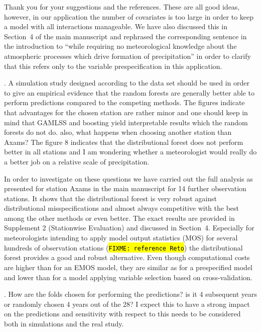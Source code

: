 \documentclass[american,foldmarks=false,noconfig]{uibklttr}
\newenvironment{review}{\fontshape{\itdefault}\fontseries{\bfdefault} \selectfont \smallskip}{\par}
\begin{document}
Thank you for your suggestions and the references. These are all
good ideas, however, in our application the number of covariates
is too large in order to keep a model with all interactions manageable.
We have also discussed this in Section~4 of the main manuscript and
rephrased the corresponding sentence in the introduction to ``while 
requiring no meteorological knowledge about the atmospheric processes 
which drive formation of precipitation'' in order to clarify that
this refers only to the variable prespecification in this application.


\begin{review}
6. A simulation study designed according to the data set should 
be used in order to give an empirical evidence that the random 
forests are generally better able to perform predictions compared 
to the competing methods. The figures indicate that advantages 
for the chosen station are rather minor and one should keep in 
mind that GAMLSS and boosting yield interpretable results which 
the random forests do not do. also, what happens when choosing 
another station than Axams? The figure 8 indicates that the 
distributional forest does not perform better in all stations 
and I am wondering whether a meteorologist would really do a 
better job on a relative scale of precipitation.
\end{review}

In order to investigate on these questions we have carried out the full
analysis as presented for station Axams in the main manuscript for 14
further observation stations. It shows that the distributional
forest is very robust against distributional misspecifications
and almost always competitive with the best among the other methods 
or even better. The exact results are provided in 
Supplement 2 (Stationwise Evaluation) and discussed in Section~4. 
Especially for meteorologists intending to apply model output 
statistics (MOS) for several hundreds of observation stations 
(\hl{\texttt{FIXME: reference Reto}})
the distributional forest provides a good and robust alternative. 
Even though computational costs are higher than for an EMOS model, 
they are similar as for a prespecified model and lower than for 
a model applying variable selection based on cross-validation.



\begin{review}
7. How are the folds chosen for performing the predictions? 
is it 4 subsequent years or randomly chosen 4 years out of 
the 28? I expect this to have a strong impact on the predictions 
and sensitivity with respect to this needs to be considered both 
in simulations and the real study.
\end{review}
\end{document}
